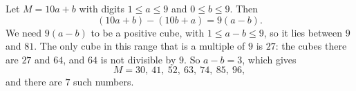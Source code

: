 Let $M=10a+b$ with digits $1\le a\le9$ and $0\le b\le9$. Then
\[
(10a+b)-(10b+a)=9(a-b).
\]
We need $9(a-b)$ to be a positive cube, with $1\le a-b\le9$, so it lies between $9$ and $81$. The only cube in this range that is a multiple of $9$ is $27$: the cubes there are $27$ and $64$, and $64$ is not divisible by $9$. So $a-b=3$, which gives
\[
M=30,\ 41,\ 52,\ 63,\ 74,\ 85,\ 96 ,
\]
and there are $\boxed{7}$ such numbers.
